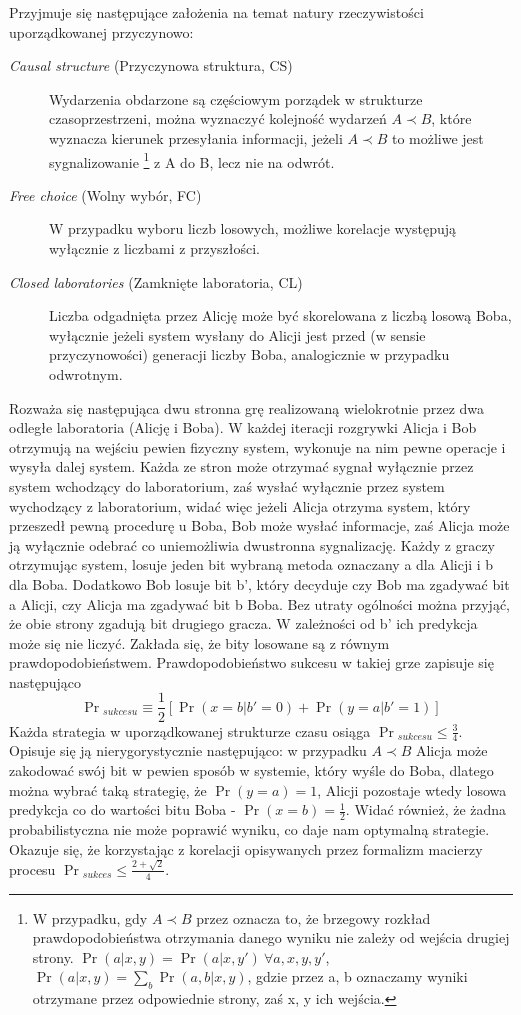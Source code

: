 \documentclass[10pt]{article} %
\begin{document}
Przyjmuje się następujące założenia na temat natury rzeczywistości uporządkowanej przyczynowo:
\begin{description}
	\item[\textit{Causal structure} (Przyczynowa struktura, CS)]
	Wydarzenia obdarzone są częściowym porządek w strukturze czasoprzestrzeni, można wyznaczyć kolejność wydarzeń $A \prec B$, które wyznacza kierunek przesyłania informacji, jeżeli $A \prec B$ to możliwe jest sygnalizowanie
	\footnote
	{W przypadku, gdy $A \prec B$ przez oznacza to, że brzegowy rozkład prawdopodobieństwa otrzymania danego wyniku nie zależy od wejścia drugiej strony. $\Pr(a|x, y) = \Pr(a|x, y')~\forall a,x,y,y'$, $\Pr(a|x,y) = \sum_b \Pr(a,b|x,y)$, gdzie przez a, b oznaczamy wyniki otrzymane przez odpowiednie strony, zaś x, y ich wejścia. } 
	z A do B, lecz nie na odwrót.
	\item[\textit{Free choice} (Wolny wybór, FC)]  
	W przypadku wyboru liczb losowych, możliwe korelacje występują wyłącznie z liczbami z przyszłości.
	\item[\textit{Closed laboratories} (Zamknięte laboratoria, CL)] 
	Liczba odgadnięta przez Alicję może być skorelowana z liczbą losową Boba, wyłącznie jeżeli system wysłany do Alicji jest przed (w sensie przyczynowości) generacji liczby Boba, analogicznie w przypadku odwrotnym.	
\end{description}
Rozważa się następująca dwu stronna grę realizowaną wielokrotnie przez dwa odległe laboratoria (Alicję i Boba). W każdej iteracji rozgrywki Alicja i Bob otrzymują na wejściu pewien fizyczny system, wykonuje na nim pewne operacje i wysyła dalej system. Każda ze stron może otrzymać sygnał wyłącznie przez 
system wchodzący do laboratorium, zaś wysłać wyłącznie przez system wychodzący z laboratorium, widać więc jeżeli Alicja otrzyma system, który przeszedł pewną procedurę u Boba, Bob może wysłać informacje, zaś Alicja może ją wyłącznie odebrać co uniemożliwia dwustronna sygnalizację.
Każdy z graczy otrzymując system, losuje jeden bit wybraną metoda oznaczany a dla Alicji i b dla Boba. Dodatkowo Bob losuje bit b', który decyduje czy Bob ma zgadywać bit a Alicji, czy Alicja ma zgadywać bit b Boba. Bez utraty ogólności można przyjąć, że obie strony zgadują bit drugiego gracza. W zależności od b' ich 
predykcja może się nie liczyć. Zakłada się, że bity losowane są z równym prawdopodobieństwem. Prawdopodobieństwo sukcesu w takiej grze zapisuje się następująco
\begin{equation}
\Pr{}_{sukcesu} \equiv \frac{1}{2} \left[ \Pr(x=b|b'=0) + \Pr(y=a|b' = 1)\right]
\end{equation}
Każda strategia w uporządkowanej strukturze czasu osiąga $\Pr{}_{sukcesu} \leq \frac{3}{4}$. Opisuje się ją nierygorystycznie następująco: w przypadku $A \prec B$ Alicja może zakodować swój bit w pewien sposób w systemie, który wyśle do Boba, dlatego można wybrać taką strategię, że $\Pr(y=a) = 1$, Alicji pozostaje wtedy losowa predykcja co do wartości bitu Boba - $\Pr(x=b) = \frac{1}{2}$. Widać również, że żadna probabilistyczna nie może poprawić wyniku, co daje nam optymalną strategie. Okazuje się, że korzystając z korelacji opisywanych przez formalizm macierzy procesu $\Pr{}_{sukces} \leq \frac{2+\sqrt{2}}{4}$.
\newpage


\end{document}
